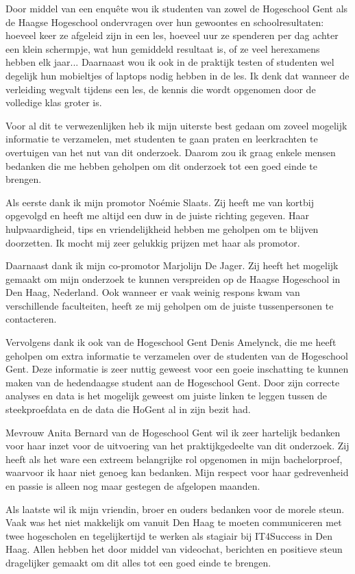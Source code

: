 Door middel van een enquête wou ik studenten van zowel de Hogeschool Gent als de Haagse Hogeschool ondervragen over hun gewoontes en schoolresultaten: hoeveel keer ze afgeleid zijn in een les, hoeveel uur ze spenderen per dag achter een klein schermpje, wat hun gemiddeld resultaat is, of ze veel herexamens hebben elk jaar... Daarnaast wou ik ook in de praktijk testen of studenten wel degelijk hun mobieltjes of laptops nodig hebben in de les. Ik denk dat wanneer de verleiding wegvalt tijdens een les, de kennis die wordt opgenomen door de volledige klas groter is.

Voor al dit te verwezenlijken heb ik mijn uiterste best gedaan om zoveel mogelijk informatie te verzamelen, met studenten te gaan praten en leerkrachten te overtuigen van het nut van dit onderzoek. Daarom zou ik graag enkele mensen bedanken die me hebben geholpen om dit onderzoek tot een goed einde te brengen.

Als eerste dank ik mijn promotor Noémie Slaats. Zij heeft me van kortbij opgevolgd en heeft me altijd een duw in de juiste richting gegeven. Haar hulpvaardigheid, tips en vriendelijkheid hebben me geholpen om te blijven doorzetten. Ik mocht mij zeer gelukkig prijzen met haar als promotor.

Daarnaast dank ik mijn co-promotor Marjolijn De Jager. Zij heeft het mogelijk gemaakt om mijn onderzoek te kunnen verspreiden op de Haagse Hogeschool in Den Haag, Nederland. Ook wanneer er vaak weinig respons kwam van verschillende faculteiten, heeft ze mij geholpen om de juiste tussenpersonen te contacteren.

Vervolgens dank ik ook van de Hogeschool Gent Denis Amelynck, die me heeft geholpen om extra informatie te verzamelen over de studenten van de Hogeschool Gent. Deze informatie is zeer nuttig geweest voor een goeie inschatting te kunnen maken van de hedendaagse student aan de Hogeschool Gent. Door zijn correcte analyses en data is het mogelijk geweest om juiste linken te leggen tussen de steekproefdata en de data die HoGent al in zijn bezit had.

Mevrouw Anita Bernard van de Hogeschool Gent wil ik zeer hartelijk bedanken voor haar inzet voor de uitvoering van het praktijkgedeelte van dit onderzoek. Zij heeft als het ware een extreem belangrijke rol opgenomen in mijn bachelorproef, waarvoor ik haar niet genoeg kan bedanken. Mijn respect voor haar gedrevenheid en passie is alleen nog maar gestegen de afgelopen maanden.

Als laatste wil ik mijn vriendin, broer en ouders bedanken voor de morele steun. Vaak was het niet makkelijk om vanuit Den Haag te moeten communiceren met twee hogescholen en tegelijkertijd te werken als stagiair bij IT4Success in Den Haag. Allen hebben het door middel van videochat, berichten en positieve steun dragelijker gemaakt om dit alles tot een goed einde te brengen.